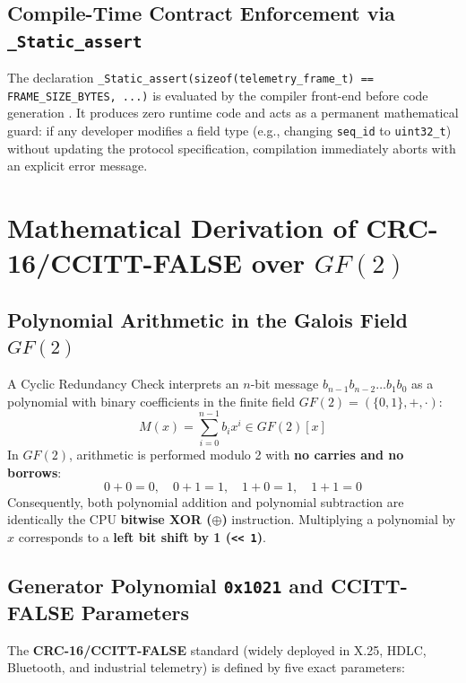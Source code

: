 \documentclass[11pt,a4paper,oneside]{report}
\begin{document}
\subsection{Compile-Time Contract Enforcement via \texttt{\_Static\_assert}}
The declaration \texttt{\_Static\_assert(sizeof(telemetry\_frame\_t) == FRAME\_SIZE\_BYTES, ...)} is evaluated by the compiler front-end before code generation \cite{gustedt2025}. It produces zero runtime code and acts as a permanent mathematical guard: if any developer modifies a field type (e.g., changing \texttt{seq\_id} to \texttt{uint32\_t}) without updating the protocol specification, compilation immediately aborts with an explicit error message.

\section{Mathematical Derivation of CRC-16/CCITT-FALSE over $GF(2)$}

\subsection{Polynomial Arithmetic in the Galois Field $GF(2)$}
A Cyclic Redundancy Check interprets an $n$-bit message $b_{n-1} b_{n-2} \dots b_1 b_0$ as a polynomial with binary coefficients in the finite field $GF(2) = (\{0, 1\}, +, \cdot)$:
\[
M(x) = \sum_{i=0}^{n-1} b_i x^i \in GF(2)[x]
\]
In $GF(2)$, arithmetic is performed modulo 2 with \textbf{no carries and no borrows}:
\[
0 + 0 = 0, \quad 0 + 1 = 1, \quad 1 + 0 = 1, \quad 1 + 1 = 0
\]
Consequently, both polynomial addition and polynomial subtraction are identically the CPU \textbf{bitwise XOR ($\oplus$)} instruction. Multiplying a polynomial by $x$ corresponds to a \textbf{left bit shift by 1 (\texttt{<< 1})}.

\subsection{Generator Polynomial \texttt{0x1021} and CCITT-FALSE Parameters}
The \textbf{CRC-16/CCITT-FALSE} standard (widely deployed in X.25, HDLC, Bluetooth, and industrial telemetry) is defined by five exact parameters:
\end{document}
